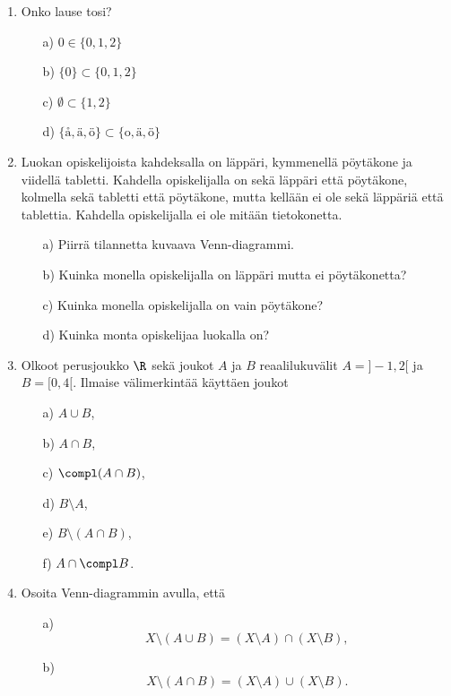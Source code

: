 \begin{enumerate}
\item Onko lause tosi?
\begin{itemize}
\item[a)] $0 \in \{0,1,2\}$
\item[b)] $\{0\} \subset \{0,1,2\}$
\item[c)] $\emptyset \subset \{1,2\}$
\item[d)] $\{\textrm{å},\textrm{ä},\textrm{ö}\} \subset \{\textrm{o},\textrm{ä},\textrm{ö}\}$
\end{itemize}

\item Luokan opiskelijoista kahdeksalla on läppäri, kymmenellä pöytäkone ja
viidellä tabletti.
Kahdella opiskelijalla on sekä läppäri että pöytäkone, kolmella sekä
tabletti että pöytäkone, mutta kellään ei ole sekä läppäriä että
tablettia. Kahdella opiskelijalla ei ole mitään tietokonetta.
\begin{itemize}
\item[a)] Piirrä tilannetta kuvaava Venn-diagrammi.
\item[b)] Kuinka monella opiskelijalla on läppäri mutta ei pöytäkonetta?
\item[c)] Kuinka monella opiskelijalla on vain pöytäkone?
\item[d)] Kuinka monta opiskelijaa luokalla on?
\end{itemize}

\item Olkoot perusjoukko $\R$ sekä joukot $A$ ja $B$ reaalilukuvälit $A=]-1,2[$ ja $B=[0,4[$. Ilmaise välimerkintää käyttäen joukot
\begin{itemize}
\item[a)] $A \cup B$,
\item[b)] $A \cap B$,
\item[c)] $\compl (A \cap B)$,
\item[d)] $B \setminus A$,
\item[e)] $B \setminus (A \cap B)$,
\item[f)] $A \cap \compl B$.
\end{itemize}

\item Osoita Venn-diagrammin avulla, että
\begin{itemize}
\item[a)] 
\[
X\setminus (A\cup B) = (X\setminus A)\cap (X\setminus B),
\]
\item[b)] 
\[
X \setminus (A\cap B) = (X\setminus A)\cup (X\setminus B).
\]
\end{itemize}


\end{enumerate}
